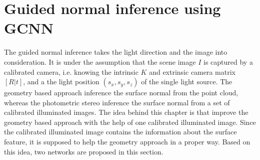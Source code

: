 \section{Guided normal inference using GCNN}
The guided normal inference takes the light direction and the image into consideration. It is under the assumption that the scene image $ I $ is captured by a calibrated camera, i.e. knowing the intrinsic $ K $ and extrinsic camera matrix $ [R|t] $, and a the light position $ (s_x, s_y, s_z) $ of the single light source. The geometry based approach inference the surface normal from the point cloud, whereas the photometric stereo inference the surface normal from a set of calibrated illuminated images. The idea behind this chapter is that improve the geometry based approach with the help of one calibrated illuminated image. Since the calibrated illuminated image contains the information about the surface feature, it is supposed to help the geometry approach in a proper way. Based on this idea, two networks are proposed in this section.

